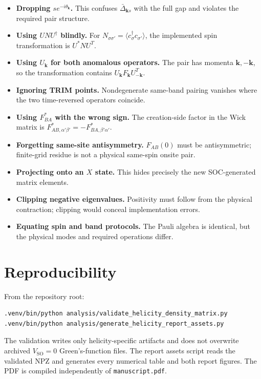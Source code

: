 \documentclass[11pt]{article}
\newcommand{\SO}{V_{\mathrm{SO}}}
\newcommand{\kb}{\mathbf k}
\begin{document}
\begin{itemize}
\item \textbf{Dropping $s e^{-i\theta_{\kb}}$.} This confuses $\bar\Delta_{\kb s}$ with the full gap and violates the required pair structure.
\item \textbf{Using $UNU^\dagger$ blindly.} For $N_{\sigma\sigma'}=\langle c_\sigma^\dagger c_{\sigma'}\rangle$, the implemented spin transformation is $U^*NU^T$.
\item \textbf{Using $U_{\kb}$ for both anomalous operators.} The pair has momenta $\kb,-\kb$, so the transformation contains $U_{\kb}F_{\kb}U_{-\kb}^T$.
\item \textbf{Ignoring TRIM points.} Nondegenerate same-band pairing vanishes where the two time-reversed operators coincide.
\item \textbf{Using $F_{BA}^*$ with the wrong sign.} The creation-side factor in the Wick matrix is $F_{AB,\alpha'\beta'}^*=-F_{BA,\beta'\alpha'}^*$.
\item \textbf{Forgetting same-site antisymmetry.} $F_{AB}(0)$ must be antisymmetric; finite-grid residue is not a physical same-spin onsite pair.
\item \textbf{Projecting onto an $X$ state.} This hides precisely the new SOC-generated matrix elements.
\item \textbf{Clipping negative eigenvalues.} Positivity must follow from the physical contraction; clipping would conceal implementation errors.
\item \textbf{Equating spin and band protocols.} The Pauli algebra is identical, but the physical modes and required operations differ.
\end{itemize}

\section{Reproducibility}
\label{app:repro}

From the repository root:
\begin{verbatim}
.venv/bin/python analysis/validate_helicity_density_matrix.py
.venv/bin/python analysis/generate_helicity_report_assets.py
\end{verbatim}
The validation writes only helicity-specific artifacts and does not overwrite archived $\SO=0$ Green's-function files. The report assets script reads the validated NPZ and generates every numerical table and both report figures. The PDF is compiled independently of \verb|manuscript.pdf|.
\end{document}
